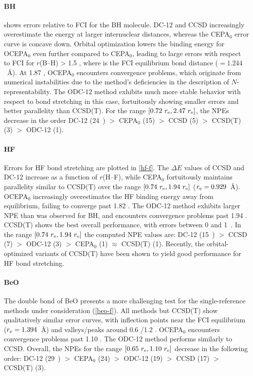 \paragraph{BH}

 shows errors relative to FCI for the BH molecule.
DC-12 and CCSD increasingly overestimate the energy at larger internuclear
distances, whereas the CEPA$_0$ error curve is concave down.
Orbital optimization lowers the binding energy for OCEPA$_0$ even further
compared to CEPA$_0$, leading to large errors with respect to FCI for $r$(B--H)
> 1.5 \re, where \re is the FCI equilibrium bond distance (\re$=1.244$~\AA). At
1.87 \re, OCEPA$_0$ encounters convergence problems, which originate from
numerical instabilities due to the method's deficiencies in the description of
$N$-representability.
The ODC-12 method exhibits much more stable behavior with respect to bond
stretching in this case, fortuitously showing smaller errors and better
parallelity than CCSD(T).
For the range $[0.72\ r_\mathrm{e}, 2.47\ r_\mathrm{e}]$, the NPEs decrease in the order 
DC-12    (24~\mhartree) $>$
CEPA$_0$ (15) $>$
CCSD     (5) $>$
CCSD(T)  (3) $>$
ODC-12   (1).


\paragraph{HF}
Errors for HF bond stretching are plotted in \cref{hf-f}.
The $\Delta E$ values of CCSD and DC-12 increase as a function of $r$(H--F),
while CEPA$_0$ fortuitously maintains parallelity similar to CCSD(T) over the
range $[0.74\ \re, 1.94\ \re]$ ($r_\mathrm{e} = 0.929$~\AA).
OCEPA$_0$ increasingly overestimates the HF binding energy away from
equilibrium, failing to converge past 1.82 \re.
The ODC-12 method exhibits larger NPE than was observed for BH, and encounters
convergence problems past 1.94 \re.
CCSD(T) shows the best overall performance, with errors between 0 and
1~\mhartree.
In the range $[0.74\ \re, 1.94\ \re]$ the computed NPE values are:
DC-12    (15~\mhartree) $>$
CCSD     (7) $>$
ODC-12   (3) $>$
CEPA$_0$ (1) $\approx$
CCSD(T)  (1).
Recently, the orbital-optimized variants of CCSD(T) have been shown to yield
good performance for HF bond stretching.\cite{Bozkaya:2012p204114}

\paragraph{BeO}
The double bond of BeO presents a more challenging test for the single-reference
methods under consideration (\cref{beo-f}).
All methods but CCSD(T) show qualitatively similar error curves, with inflection
points near the FCI equilibrium ($r_\mathrm{e}=1.394$~\AA) and valleys/peaks around 0.6
\re/1.2 \re.
OCEPA$_0$ encounters convergence problems past 1.10 \re.
The ODC-12 method performs similarly to CCSD\@.
Overall, the NPEs for the range $[0.65\ r_\mathrm{e}, 1.10\ r_\mathrm{e}]$ decrease in the
following order:
DC-12    (29~\mhartree) $>$ 
CEPA$_0$ (24) $>$
ODC-12   (19) $>$
CCSD     (17) $>$
CCSD(T)  (3).

